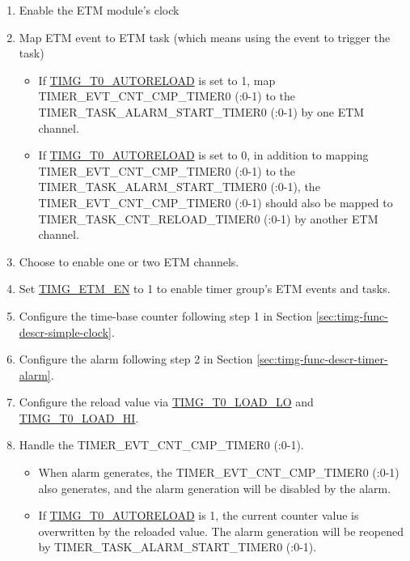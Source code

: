 \documentclass[main\_\_EN.tex]{subfiles}
\begin{document}
\begin{enumerate}
    \item Enable the ETM module's clock
    \item Map ETM event to ETM task (which means using the event to trigger the task)
    \begin{itemize}
        \item If \hyperref[fielddesc:TIMGTXAUTORELOAD]{TIMG\_T0\_AUTORELOAD} is set to 1, map TIMER\_EVT\_CNT\_CMP\_TIMER0 (:0-1) to the TIMER\_TASK\_ALARM\_START\_TIMER0 (:0-1) by one ETM channel.
        \item If \hyperref[fielddesc:TIMGTXAUTORELOAD]{TIMG\_T0\_AUTORELOAD} is set to 0, in addition to mapping TIMER\_EVT\_CNT\_CMP\_TIMER0 (:0-1) to the TIMER\_TASK\_ALARM\_START\_TIMER0 (:0-1), the TIMER\_EVT\_CNT\_CMP\_TIMER0 (:0-1) should also be mapped to TIMER\_TASK\_CNT\_RELOAD\_TIMER0 (:0-1) by another ETM channel.
    \end{itemize}
    \item Choose to enable one or two ETM channels.
    \item Set \hyperref[fielddesc:TIMGETMEN]{TIMG\_ETM\_EN} to 1 to enable timer group's ETM events and tasks.
    \item Configure the time-base counter following step 1 in Section \ref{sec:timg-func-descr-simple-clock}.
    \item Configure the alarm following step 2 in Section \ref{sec:timg-func-descr-timer-alarm}.
    \item Configure the reload value via \hyperref[fielddesc:TIMGTXLOADLO]{TIMG\_T0\_LOAD\_LO} and \hyperref[fielddesc:TIMGTXLOADHI]{TIMG\_T0\_LOAD\_HI}.
    \item Handle the TIMER\_EVT\_CNT\_CMP\_TIMER0 (:0-1).
    \begin{itemize}
        \item When alarm generates, the TIMER\_EVT\_CNT\_CMP\_TIMER0 (:0-1) also generates, and the alarm generation will be disabled by the alarm.
        \item If \hyperref[fielddesc:TIMGTXAUTORELOAD]{TIMG\_T0\_AUTORELOAD} is 1, the current counter value is overwritten by the reloaded value. The alarm generation will be reopened by TIMER\_TASK\_ALARM\_START\_TIMER0 (:0-1).

\end{itemize}
\end{enumerate}
\end{document}
